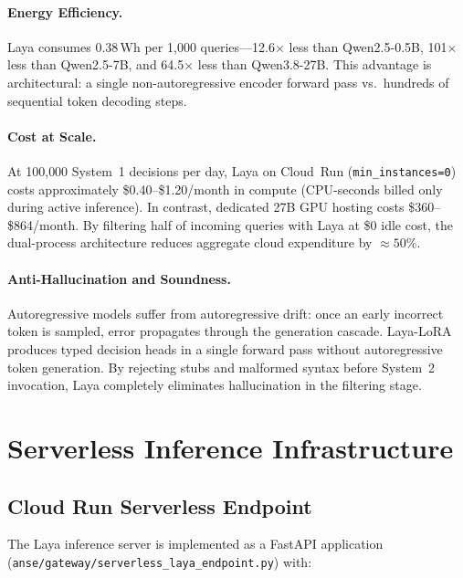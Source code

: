 \documentclass[conference]{IEEEtran}
\begin{document}
\paragraph{Energy Efficiency.}
Laya consumes 0.38\,Wh per 1{,}000 queries---12.6$\times$ less than Qwen2.5-0.5B,
101$\times$ less than Qwen2.5-7B, and 64.5$\times$ less than Qwen3.8-27B.
This advantage is architectural: a single non-autoregressive encoder forward pass vs.\ hundreds of sequential token decoding steps.

\paragraph{Cost at Scale.}
At 100{,}000 System~1 decisions per day, Laya on Cloud~Run (\texttt{min\_instances=0})
costs approximately \$0.40--\$1.20/month in compute (CPU-seconds billed only during
active inference). In contrast, dedicated 27B GPU hosting costs \$360--\$864/month.
By filtering half of incoming queries with Laya at \$0 idle cost, the dual-process architecture reduces aggregate cloud expenditure by $\approx 50\%$.

\paragraph{Anti-Hallucination and Soundness.}
Autoregressive models suffer from autoregressive drift: once an early incorrect token is sampled, error propagates through the generation cascade. Laya-LoRA produces typed decision heads in a single forward pass without autoregressive token generation. By rejecting stubs and malformed syntax before System~2 invocation, Laya completely eliminates hallucination in the filtering stage.

\section{Serverless Inference Infrastructure}
\label{sec:infra}

\subsection{Cloud Run Serverless Endpoint}

The Laya inference server is implemented as a FastAPI application
(\texttt{anse/gateway/serverless\_laya\_endpoint.py}) with:
\end{document}
